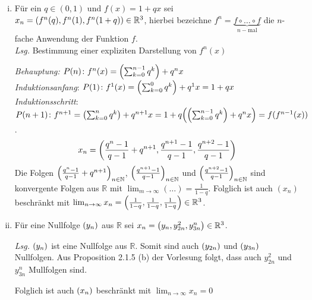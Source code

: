 \documentclass{article}
\begin{document}
\begin{enumerate}[(i)]
\item Für ein $q \in (0, 1)$ und $f(x) = 1 + qx$ sei
  $x_n = \qty(f^n(q), f^n(1), f^n(1 + q)) \in \mathbb{R}^3$, hierbei bezeichne
  $f^n = \underset{n-\text{mal}}{\underbrace{f \circ \ldots \circ f}}$ die $n$-fache
  Anwendung der Funktion $f$. \\

  \textit{Lsg.} Bestimmung einer expliziten Darstellung von $f^n(x)$

  \textit{Behauptung:} $P(n) \colon f^n (x) = \qty(\sum_{k = 0}^{n - 1} q^k) + q^nx$ \\
  \textit{Induktionsanfang}: $P(1) \colon f^1(x) = \qty(\sum_{k = 0}^{0} q^k) + q^1x = 1 + qx$ \\
  \textit{Induktionsschritt}: $P(n + 1) \colon f^{n + 1} = \qty(\sum_{k = 0}^{n} q^k) + q^{n + 1}x
  = 1 + q\qty(\qty(\sum_{k = 0}^{n - 1} q^k) + q^{n}x) = f(f^{n - 1}(x))$.
  \begin{align*}
    x_n = \qty(\frac{q^n - 1}{q - 1} + q^{n + 1}, \frac{q^{n + 1} - 1}{q - 1}, \frac{q^{n + 2} - 1}{q - 1})
  \end{align*}
  Die Folgen $\qty(\frac{q^n - 1}{q - 1} + q^{n + 1})_{n \in \mathbb{N}}$,
  $\qty(\frac{q^{n + 1} - 1}{q - 1})_{n \in \mathbb{N}}$
  und
  $\qty(\frac{q^{n + 2} - 1}{q - 1})_{n \in \mathbb{N}}$ sind konvergente Folgen aus
  $\mathbb{R}$ mit $\lim_{m \to \infty} (\ldots) = \frac{1}{1 - q}$.
  Folglich ist auch $(x_n)$ beschränkt mit
  $\lim_{n \to \infty} x_n = \qty( \frac{1}{1 - q},  \frac{1}{1 - q},  \frac{1}{1 - q}) \in \mathbb{R}^3$.
\newpage
\item
  Für eine Nullfolge $\qty(y_n)$ aus $\mathbb{R}$ sei $x_n = \qty(y_n, y_{2n}^2, y_{3n}^n) \in \mathbb{R}^3$.

  \textit{Lsg.} $\qty(y_n)$ ist eine Nullfolge aus $\mathbb{R}$.
  Somit sind auch $\qty(y_{2n})$ und $\qty(y_{3n})$ Nullfolgen.
  Aus Proposition 2.1.5 (b) der Vorlesung folgt, dass auch $y_{2n}^2$ und $y_{3n}^n$ Mullfolgen sind.

  Folglich ist auch $\qty(x_n)$ beschränkt mit $\lim_{n \to \infty} x_n = 0$

\end{enumerate}
\end{document}
